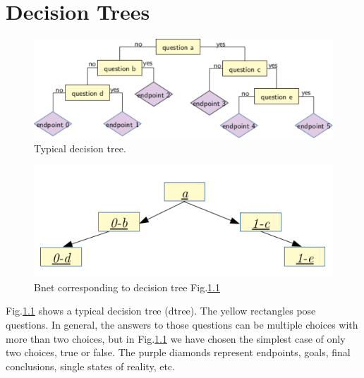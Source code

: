 \chapter{Decision Trees}\label{ch-dtree}

\begin{figure}[h!]
\centering
\includegraphics[width=6in]
{dtree/typical-dtree.pdf}
\caption{Typical decision tree.} 
\label{fig-typical-dtree}
\end{figure}

\begin{figure}[h!]
\centering
\includegraphics[width=5in]
{dtree/typical-dtree-bnet.pdf}
\caption{Bnet corresponding to 
decision tree
 Fig.\ref{fig-typical-dtree} }
\label{fig-typical-dtree-bnet}
\end{figure}

Fig.\ref{fig-typical-dtree}
shows a typical decision tree (dtree).
The yellow 
rectangles pose 
questions. In general,
the answers to those
questions can
be multiple choices with
more than two choices,
but in Fig.\ref{fig-typical-dtree}
we have chosen the simplest case
of only two choices, 
true or false.
The purple diamonds represent 
endpoints, goals, final
conclusions,
single states of reality, etc.

